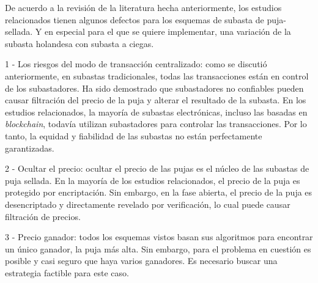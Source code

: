 


    De acuerdo a la revisión de la literatura hecha anteriormente, los estudios relacionados tienen algunos defectos para los 
    esquemas de subasta de puja-sellada. Y en especial para el que se quiere implementar, una variación de la subasta holandesa con 
    subasta a ciegas.

    1 - Los riesgos del modo de transacción centralizado: como se discutió anteriormente, en subastas tradicionales, todas las transacciones
    están en control de los subastadores. Ha sido demostrado que subastadores no confiables pueden causar filtración del precio de la puja
    y alterar el resultado de la subasta. En los estudios relacionados, la mayoría de subastas electrónicas, incluso las basadas en 
    \textit{blockchain}, todavía utilizan subastadores para controlar las transacciones. Por lo tanto, la equidad y fiabilidad de las 
    subastas no están perfectamente garantizadas.

    2 - Ocultar el precio: ocultar el precio de las pujas es el núcleo de las subastas de puja sellada. En la mayoría de los estudios 
    relacionados, el precio de la puja es protegido por encriptación. Sin embargo, en la fase abierta, el precio de la puja es desencriptado
    y directamente revelado por verificación, lo cual puede causar filtración de precios.

    3 - Precio ganador: todos los esquemas vistos basan sus algoritmos para encontrar un único ganador, la puja más alta. Sin embargo, para
    el problema en cuestión es posible y casi seguro que haya varios ganadores. Es necesario buscar una estrategia factible para este caso.

